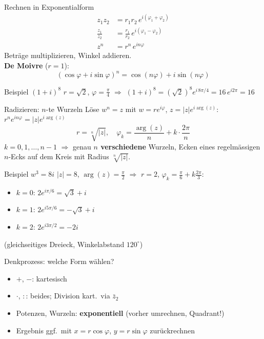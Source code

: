 \documentclass[a4paper, fontsize=7pt]{scrartcl}
\begin{document}
\begin{mainbox}{Rechnen in Exponentialform}
\begin{align*}
z_1 z_2 &= r_1 r_2\, e^{i(\varphi_1 + \varphi_2)}\\
\frac{z_1}{z_2} &= \frac{r_1}{r_2}\, e^{i(\varphi_1 - \varphi_2)}\\
z^n &= r^n\, e^{in\varphi}
\end{align*}
Beträge multiplizieren, Winkel addieren.\\
\textbf{De Moivre} ($r = 1$):
$$(\cos\varphi + i\sin\varphi)^n = \cos(n\varphi) + i\sin(n\varphi)$$
\end{mainbox}

\begin{subbox}{Beispiel $(1 + i)^8$}
$r = \sqrt2$, $\varphi = \frac\pi4$ $\Rightarrow$
$(1+i)^8 = (\sqrt2)^8 e^{i\,8\pi/4} = 16\,e^{i2\pi} = 16$
\end{subbox}

\begin{mainbox}{Radizieren: $n$-te Wurzeln}
Löse $w^n = z$ mit $w = re^{i\varphi}$, $z = |z|e^{i\arg(z)}$:
$r^n e^{in\varphi} = |z| e^{i\arg(z)}$
$$\boxed{r = \sqrt[n]{|z|}, \quad \varphi_k = \frac{\arg(z)}{n}
+ k\cdot\frac{2\pi}{n}}$$
$k = 0, 1, \ldots, n-1$ $\Rightarrow$ genau \textbf{$n$ verschiedene}
Wurzeln, Ecken eines regelmässigen $n$-Ecks auf dem Kreis mit Radius
$\sqrt[n]{|z|}$.
\end{mainbox}

\begin{subbox}{Beispiel $w^3 = 8i$}
$|z| = 8$, $\arg(z) = \frac\pi2$ $\Rightarrow$ $r = 2$,
$\varphi_k = \frac\pi6 + k\frac{2\pi}{3}$:
\begin{itemize}
    \item $k = 0$: $2e^{i\pi/6} = \sqrt3 + i$
    \item $k = 1$: $2e^{i5\pi/6} = -\sqrt3 + i$
    \item $k = 2$: $2e^{i3\pi/2} = -2i$
\end{itemize}
(gleichseitiges Dreieck, Winkelabstand $120^\circ$)
\end{subbox}

\begin{subbox}{Denkprozess: welche Form wählen?}
\begin{itemize}
    \item $+$, $-$: kartesisch
    \item $\cdot$, $:$: beides; Division kart.\ via $\bar{z}_2$
    \item Potenzen, Wurzeln: \textbf{exponentiell}
          (vorher umrechnen, Quadrant!)
    \item Ergebnis ggf.\ mit $x = r\cos\varphi$, $y = r\sin\varphi$
          zurückrechnen
\end{itemize}
\end{subbox}
\end{document}
